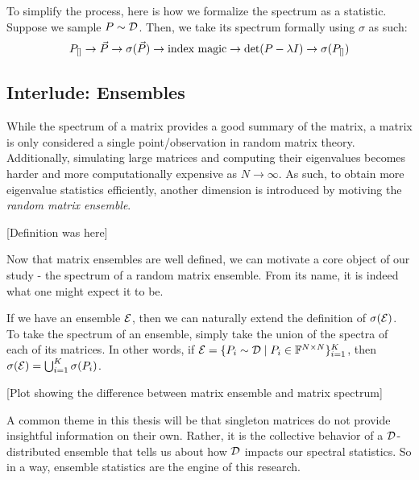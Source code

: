 To simplify the process, here is how we formalize the spectrum as a statistic. Suppose we sample $P \sim \mathcal{D}$. Then, we take its spectrum formally using $\sigma$ as such:\hfill
$$P_{[]} \rightarrow \vec{P} \rightarrow \sigma(\vec{P}) \rightarrow \text{index magic} \rightarrow \det(P - \lambda I) \rightarrow \sigma(P_{[]})$$


\subsection{Interlude: Ensembles}
While the spectrum of a matrix provides a good summary of the matrix, a matrix is only considered a single point/observation in random matrix theory. Additionally, simulating large matrices and computing their eigenvalues becomes harder and more computationally expensive as $N \to \infty$. As such, to obtain more eigenvalue statistics efficiently, another dimension is introduced by motiving the \textit{random matrix ensemble}.

[Definition was here]

Now that matrix ensembles are well defined, we can motivate a core object of our study - the spectrum of a random matrix ensemble. From its name, it is indeed what one might expect it to be.

\begin{definition}
If we have an ensemble $\mathcal{E}$, then we can naturally extend the definition of $\sigma(\mathcal{E})$. To take the spectrum of an ensemble, simply take the union of the spectra of each of its matrices. In other words, if $\mathcal{E} = \{P_i \sim \mathcal{D} \mid P_i \in \mathbb{F}^{N \times N}\}_{i = 1}^K$, then $\sigma(\mathcal{E}) = \bigcup_{i=1}^K \sigma(P_i)$.
\end{definition}

[Plot showing the difference between matrix ensemble and matrix spectrum]

A common theme in this thesis will be that singleton matrices do not provide insightful information on their own. Rather, it is the collective behavior of a $\mathcal{D}$-distributed ensemble that tells us about how $\mathcal{D}$ impacts our spectral statistics. So in a way, ensemble statistics are the engine of this research.


